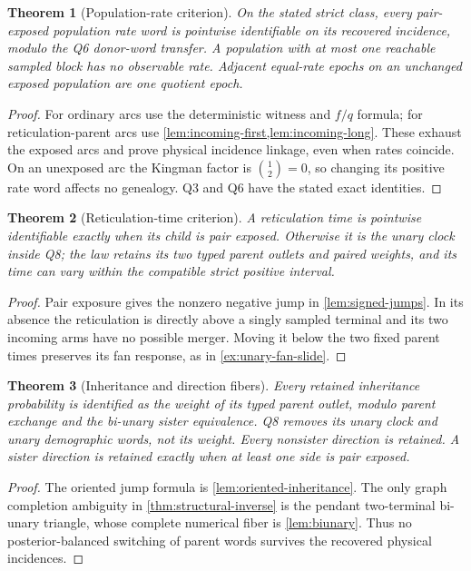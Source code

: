 \documentclass[11pt]{article}
\newtheorem{theorem}{Theorem}[section]
\begin{document}
\begin{theorem}[Population-rate criterion]
\label{thm:rates}
On the stated strict class, every pair-exposed population rate word is
pointwise identifiable on its recovered incidence, modulo the Q6 donor-word
transfer.  A population with at most one reachable sampled block has no
observable rate.  Adjacent equal-rate epochs on an unchanged exposed
population are one quotient epoch.
\end{theorem}
\begin{proof}
For ordinary arcs use the deterministic witness and $f/q$ formula;
for reticulation-parent arcs use
\cref{lem:incoming-first,lem:incoming-long}.  These exhaust the exposed
arcs and prove physical incidence linkage, even when rates coincide.
On an unexposed arc the Kingman factor is $\binom12=0$, so changing its
positive rate word affects no genealogy.  Q3 and Q6 have the stated exact
identities.
\end{proof}

\begin{theorem}[Reticulation-time criterion]
\label{thm:event-time}
A reticulation time is pointwise identifiable exactly when its child is pair
exposed.  Otherwise it is the unary clock inside Q8; the law retains its two
typed parent outlets and paired weights, and its time can vary within the
compatible strict positive interval.
\end{theorem}
\begin{proof}
Pair exposure gives the nonzero negative jump in
\cref{lem:signed-jumps}.  In its absence the reticulation is directly above
a singly sampled terminal and its two incoming arms have no possible
merger.  Moving it below the two fixed parent times preserves its fan
response, as in \cref{ex:unary-fan-slide}.
\end{proof}

\begin{theorem}[Inheritance and direction fibers]
\label{thm:inheritance}
Every retained inheritance probability is identified as the weight of its
typed parent outlet, modulo parent exchange and the bi-unary sister
equivalence.  Q8 removes its unary clock and unary demographic words, not
its weight.  Every nonsister direction is retained.  A sister direction is
retained exactly when at least one side is pair exposed.
\end{theorem}
\begin{proof}
The oriented jump formula is \cref{lem:oriented-inheritance}.  The only
graph completion ambiguity in \cref{thm:structural-inverse} is the pendant
two-terminal bi-unary triangle, whose complete numerical fiber is
\cref{lem:biunary}.  Thus no posterior-balanced switching of parent words
survives the recovered physical incidences.
\end{proof}
\end{document}
